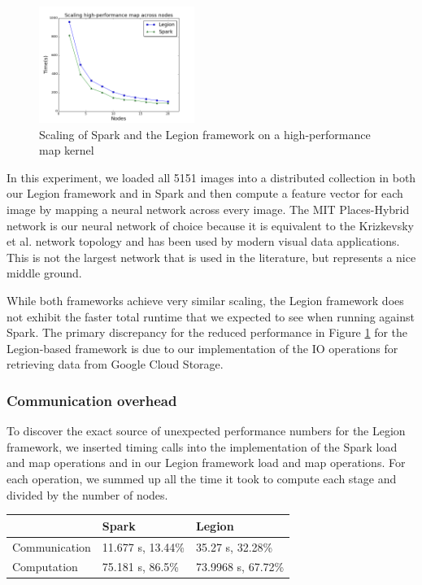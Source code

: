 \documentclass[tog]{acmsiggraph}
\begin{document}
\begin{figure}
\includegraphics[width=0.45\textwidth]{figures/scaling}
\caption{Scaling of Spark and the Legion framework on a high-performance map
  kernel}
\label{fig:scaling}
\end{figure}

In this experiment, we loaded all 5151 images into a distributed collection in
both our Legion framework and in Spark and then compute a feature vector for
each image by mapping a neural network across every image. The MIT
Places-Hybrid network \cite{zhou2014learning} is our neural network of choice
because it is equivalent to the Krizkevsky et al. network topology
\cite{NIPS2012_4824} and has been used by modern visual data applications. This
is not the largest network that is used in the literature, but represents a
nice middle ground.

While both frameworks achieve very similar scaling, the Legion framework does
not exhibit the faster total runtime that we expected to see when running
against Spark. The primary discrepancy for the reduced performance in Figure
\ref{fig:scaling} for the Legion-based framework is due to our implementation
of the IO operations for retrieving data from Google Cloud Storage.

\subsubsection{Communication overhead}

To discover the exact source of unexpected performance numbers for the Legion
framework, we inserted timing calls into the implementation of the Spark load
and map operations and in our Legion framework load and map operations. For
each operation, we summed up all the time it took to compute each stage and
divided by the number of nodes.
\begin{center}
    \begin{tabular}{| l | l | l |}
    \hline
    & Spark & Legion \\ \hline
    Communication & 11.677 s, 13.44\% & 35.27 s, 32.28\% \\ \hline
    Computation & 75.181 s, 86.5\% & 73.9968 s, 67.72\% \\ \hline
    \end{tabular}
\end{center}
\end{document}
